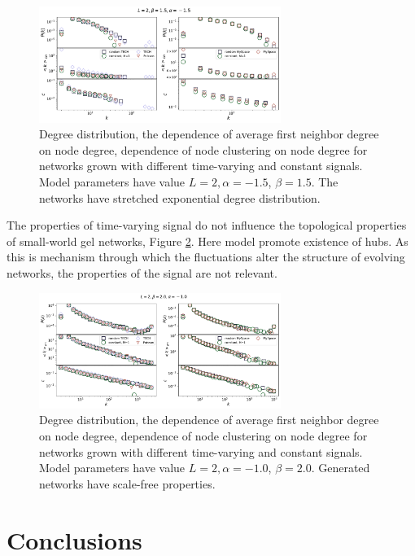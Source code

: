 \begin{figure}[h!]
	\centering
	\includegraphics[width=0.7\textwidth]{Figures/b3.pdf}
	\caption{Degree distribution, the dependence of average first neighbor degree on node degree, dependence of node clustering on node degree for networks grown with different time-varying and constant signals. Model parameters have value $L=2, \alpha=-1.5$, $\beta=1.5$. The networks have stretched exponential degree distribution.}
	\label{fig:properties_se}
\end{figure}

The properties of time-varying signal do not influence the topological properties of small-world gel networks, Figure \ref{fig:properties_sw}. Here model promote existence of hubs. As this is mechanism through which the fluctuations alter the structure of evolving networks, the properties of the signal are not relevant.  


\begin{figure}[h!]
	\centering
	\includegraphics[width=0.7\textwidth]{Figures/b2.pdf}
	\caption{Degree distribution, the dependence of average first neighbor degree on node degree, dependence of node clustering on node degree for networks grown with different time-varying and constant signals. Model parameters have value $ L=2, \alpha=-1.0$, $\beta=2.0$. Generated networks have scale-free properties.}
	\label{fig:properties_sw}
\end{figure}


\newpage 
\section{Conclusions}

